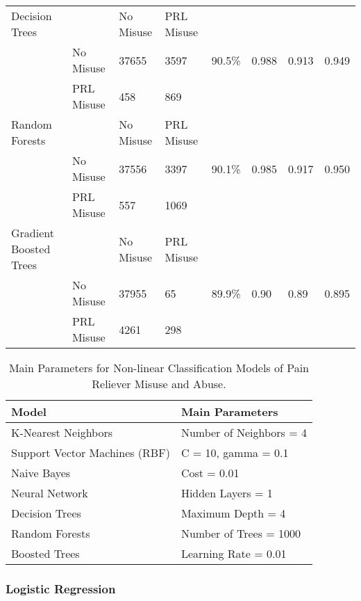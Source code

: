 \documentclass[sigconf]{acmart}
\begin{document}
\begin{table*}[ht]
\begin{tabular}{llllllll}
    \midrule
    Decision Trees & & No Misuse & PRL Misuse &  &  &  & \\
     & No Misuse & 37655 & 3597 & 90.5\% & 0.988 & 0.913 & 0.949 \\
     & PRL Misuse &  458 &  869 &  &  &  & \\
    \midrule
    Random Forests & & No Misuse & PRL Misuse &  &  &  & \\
     & No Misuse & 37556 & 3397 & 90.1\% & 0.985 & 0.917 & 0.950 \\
     & PRL Misuse &  557 & 1069 &  &  &  & \\
    \midrule
    Gradient Boosted Trees & & No Misuse & PRL Misuse &  &  &  & \\
     & No Misuse & 37955 &  65 & 89.9\% & 0.90 & 0.89 & 0.895 \\
     & PRL Misuse & 4261 & 298 &  &  &  & \\
    \bottomrule
  \end{tabular}
\end{table*}

 
\begin{table}
  \caption{Main Parameters for Non-linear Classification Models of 
  Pain Reliever Misuse and Abuse.}
  \label{tab:freq}
  \begin{tabular}{ll}
    \toprule
    Model & Main Parameters \\
    \midrule
    K-Nearest Neighbors & Number of Neighbors = 4 \\
    Support Vector Machines (RBF) & C = 10, gamma = 0.1 \\
    Naive Bayes & Cost = 0.01 \\
    Neural Network & Hidden Layers = 1 \\
    Decision Trees & Maximum Depth = 4 \\ 
    Random Forests & Number of Trees = 1000 \\
    Boosted Trees & Learning Rate = 0.01 \\ 
    \bottomrule
  \end{tabular}
\end{table}


\subsubsection{Logistic Regression}
\end{document}
